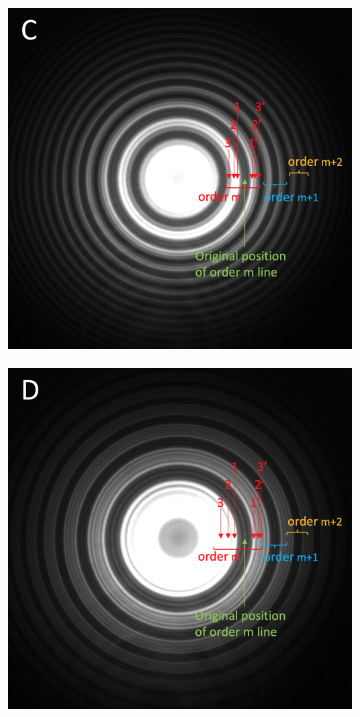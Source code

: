 \documentclass[11pt]{article}
\begin{document}
\begin{figure}[h!]
\begin{subfigure}{0.47\linewidth}
    \end{subfigure}
    \begin{subfigure}{0.47\linewidth}
        \includegraphics[width=\linewidth]{Cd green/C.png}
    \end{subfigure}
    \begin{subfigure}{0.47\linewidth}
        \includegraphics[width=\linewidth]{Cd green/D.png}

\end{subfigure}
\end{figure}
\end{document}
